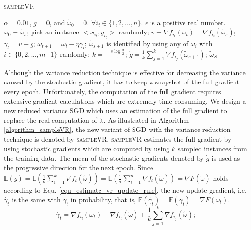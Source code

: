 \documentclass[letterpaper]{article}
\begin{document}
\begin{algorithm}[t]
    \caption{\textsc{sampleVR}}
    \label{algorithm_sampleVR}
    \begin{algorithmic}[1]
        \Require $\alpha=0.01$,  $g=\mathbf{0}$, and $\tilde{\omega}_0=\mathbf{0}$. $\forall i_t\in\{1,2, ..., n\}$.   $\epsilon$ is a positive real number.
            \State $\omega_0=\tilde{\omega}_s$;
                \State pick an instance $\mathrm{<}x_{i_t},y_{i_t}\mathrm{>}$ randomly;
                \State  $v=\nabla f_{i_t}(\omega_t)-\nabla f_{i_t}(\tilde{\omega}_s)$;
                \State $\gamma_{t}=v+\dot{g}$;
                \State $\omega_{t+1} = \omega_t - \eta \gamma_{t}$;
            \EndFor
            \State $\tilde{\omega}_{s+1}$ is identified by using any of $\omega_{i}$ with $i\mathrm{\in}\{0,2, ..., m\mathrm{-}1\}$ randomly;
            \State $k=-\frac{s\log\frac{\alpha}{2}}{\epsilon}$;
            \State $\dot{g} =\frac{1}{k}\sum\limits_{j=1}^{k}\nabla f_{i_j}(\tilde{\omega}_{s+1})$;
          \EndFor
        \Return $\tilde{\omega}_S$.
    \end{algorithmic}
\end{algorithm}

Although  the variance reduction technique is effective for decreasing the variance caused by the stochastic gradient, it has to keep a snapshot of the full gradient  every epoch. Unfortunately, the computation of the full gradient requires extensive gradient calculations which  are extremely time-consuming.  We design a new reduced variance SGD which uses an estimation of the full gradient to replace the real computation of it.  As illustrated in Algorithm \ref{algorithm_sampleVR}, the new variant of SGD with the variance reduction technique is denoted by \textsc{sampleVR}.  \textsc{sampleVR} estimates the full gradient by using  stochastic gradients which are computed by using $k$ sampled  instances  from the training data.  The mean of the stochastic gradients denoted by $\dot{g}$ is used as the progressive direction for the next epoch. Since  $\mathbb{E}(\dot{g}) = \mathbb{E} \left(  \frac{1}{k}\sum\limits_{i=1}^k\nabla f_i(\tilde{\omega}) \right)=  \mathbb{E} \left (\frac{1}{n}\sum\limits_{i=1}^n\nabla f_i(\tilde{\omega}) \right)  =  \nabla F(\tilde{\omega})$ holds according to Equ. \ref{equ_estimate_vr_update_rule}, the new update gradient, i.e. $\dot{\gamma_t}$ is the same with $\gamma_t$ in probability, that is, $\mathbb{E} (  \dot{\gamma_t}) = \mathbb{E} (\gamma_t) = \nabla F(\omega_{t})$. 
\begin{equation}
\label{equ_estimate_vr_update_rule}
\dot{\gamma_t}=\nabla f_{i_t}(\omega_{t})-\nabla f_{i_t}(\tilde{\omega})+\frac{1}{k}\sum\limits_{j=1}^k\nabla f_{i_j}(\tilde{\omega});
\end{equation}
\end{document}
